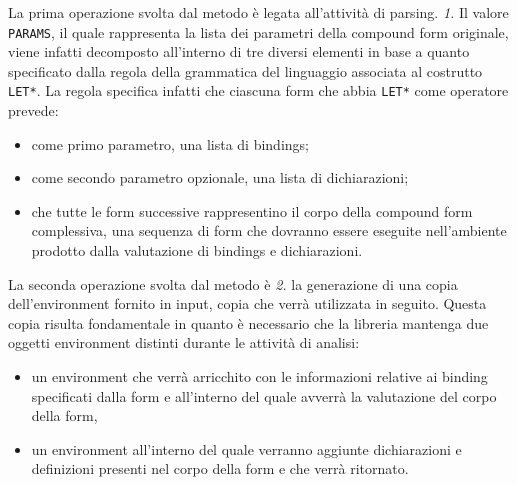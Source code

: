 La prima operazione svolta dal metodo è legata all'attività di parsing.
\textit{1.} Il valore \texttt{PARAMS}, il quale rappresenta la lista dei
parametri della compound form originale, viene infatti decomposto all’interno
di tre diversi elementi in base a quanto specificato dalla regola della
grammatica del linguaggio associata al costrutto \texttt{LET*}. La regola
specifica infatti che ciascuna form che abbia \texttt{LET*} come operatore
prevede:

\begin{itemize}

\item come primo parametro, una lista di bindings;

\item come secondo parametro opzionale, una lista di dichiarazioni;

\item che tutte le form successive rappresentino il corpo della compound form
complessiva, una sequenza di form che dovranno essere eseguite nell’ambiente
prodotto dalla valutazione di bindings e dichiarazioni.

\end{itemize}

La seconda operazione svolta dal metodo è \textit{2.} la generazione di una
copia dell’environment fornito in input, copia che verrà utilizzata in
seguito. Questa copia risulta fondamentale in quanto è necessario che la
libreria mantenga due oggetti environment distinti durante le attività di
analisi:

\begin{itemize}

\item un environment che verrà arricchito con le informazioni relative ai
binding specificati dalla form e all'interno del quale avverrà la valutazione
del corpo della form,

\item un environment all'interno del quale verranno aggiunte dichiarazioni e
definizioni presenti nel corpo della form e che verrà ritornato.

\end{itemize}



